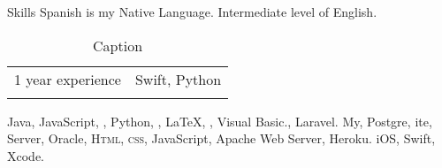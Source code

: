 
\begin{rubric}{Skills}
\entry*[Languages]
	Spanish is my Native Language. 
	Intermediate level of English.

\begin{table}[]
    \centering
    \begin{tabular}{c c}
         1 year experience & Swift, Python \\
         & 
    \end{tabular}
    \caption{Caption}
    \label{tab:my_label}
\end{table}
	Java, 
	JavaScript,
	, 
	Python, 
	, 
	\LaTeX,
	, 
	Visual Basic., 
	Laravel. 
\entry*[Databases]
	My, 
	Postgre,  
	ite,  Server, Oracle, 
	\textsc{Html, css}, JavaScript, Apache Web Server, Heroku. 
\entry*[Mobile]
	iOS, Swift, Xcode.
\end{rubric}
